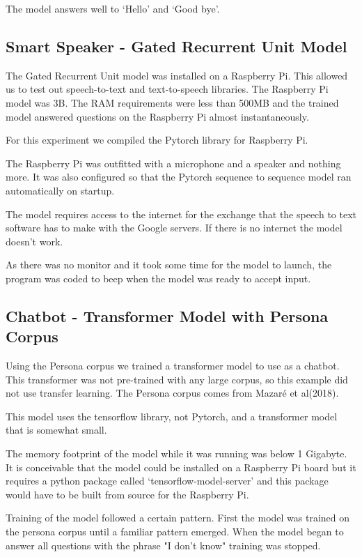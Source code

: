 The model answers well to `Hello' and `Good bye'.

\subsection{Smart Speaker - Gated Recurrent Unit Model}

The Gated Recurrent Unit model was installed on a Raspberry Pi. This allowed us to test out speech-to-text and text-to-speech libraries. The Raspberry Pi model was 3B. The RAM requirements were less than 500MB and the trained model answered questions on the Raspberry Pi almost instantaneously.

For this experiment we compiled the Pytorch library for Raspberry Pi.

The Raspberry Pi was outfitted with a microphone and a speaker and nothing more. It was also configured so that the Pytorch sequence to sequence model ran automatically on startup.

The model requires access to the internet for the exchange that the speech to text software has to make with the Google servers. If there is no internet the model doesn't work.

As there was no monitor and it took some time for the model to launch, the program was coded to beep when the model was ready to accept input.

\subsection{Chatbot - Transformer Model with Persona Corpus}
Using the Persona corpus we trained a transformer model to use as a chatbot. This transformer was not pre-trained with any large corpus, so this example did not use transfer learning. The Persona corpus comes from Mazar{\'{e}} et al(2018)\cite{DBLP:journals/corr/abs-1809-01984}.

This model uses the tensorflow library, not Pytorch, and a transformer model that is somewhat small.

The memory footprint of the model while it was running was below 1 Gigabyte. It is conceivable that the model could be installed on a Raspberry Pi board but it requires a python package called `tensorflow-model-server' and this package would have to be built from source for the Raspberry Pi. 

Training of the model followed a certain pattern. First the model was trained on the persona corpus until a familiar pattern emerged. When the model began to answer all questions with the 
phrase "I don't know" training was stopped. 

